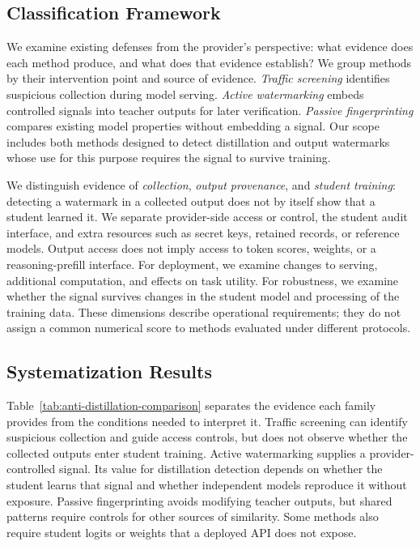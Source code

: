 \subsection{Classification Framework}
\label{sec:classification-framework}

We examine existing defenses from the provider's perspective: what evidence
does each method produce, and what does that evidence establish?
We group methods by their intervention point and source of evidence.
\emph{Traffic screening} identifies suspicious collection during model serving.
\emph{Active watermarking} embeds controlled signals into teacher outputs for
later verification. \emph{Passive fingerprinting} compares existing model
properties without embedding a signal.
Our scope includes both methods designed to detect distillation and output
watermarks whose use for this purpose requires the signal to survive training.

We distinguish evidence of \emph{collection}, \emph{output provenance}, and
\emph{student training}: detecting a watermark in a collected output does not
by itself show that a student learned it.
We separate provider-side access or control, the student audit interface,
and extra resources such as secret keys, retained records, or reference models.
Output access does not imply access to token scores, weights, or a reasoning-prefill interface.
For deployment, we examine changes to serving, additional computation, and
effects on task utility. For robustness, we examine whether the signal
survives changes in the student model and processing of the training data.
These dimensions describe operational requirements; they do not assign a
common numerical score to methods evaluated under different protocols.

\subsection{Systematization Results}
\label{sec:systematization-results}



Table~\ref{tab:anti-distillation-comparison} separates the evidence each family
provides from the conditions needed to interpret it.
Traffic screening can identify suspicious collection and guide access controls,
but does not observe whether the collected outputs enter student training.
Active watermarking supplies a provider-controlled signal. Its value for
distillation detection depends on whether the student learns that signal and
whether independent models reproduce it without exposure.
Passive fingerprinting avoids modifying teacher outputs, but shared patterns
require controls for other sources of similarity. Some methods also require
student logits or weights that a deployed API does not expose.

